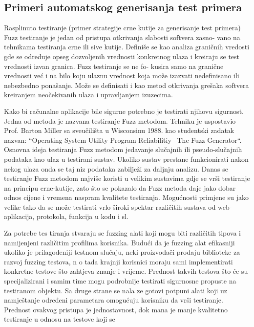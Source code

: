 \documentclass[12pt,oneside]{memoir}
\begin{document}
\subsection{Primeri automatskog generisanja test primera}
Rasplinuto testiranje (primer strategije crne kutije za generisanje test primera)
Fuzz testiranje je jedan od pristupa otkrivanja slabosti softvera zasno-
vano na tehnikama testiranja crne ili sive kutije. Definiše se kao analiza
graničnih vredosti gde se odreduje opseg dozvoljenih vrednosti konkretnog
ulaza i kreiraju se test vrednosti izvan granica. Fuzz testiranje se ne fo-
kusira samo na granične vrednosti već i na bilo koju ulaznu vrednost koja
može izazvati nedefinisano ili nebezbedno ponašanje. Može se definisati i kao metod otkrivanja grešaka softvera kreiranjem neočekivanih ulaza i
upravljanjem izuzecima. \par
Kako bi računalne aplikacije bile sigurne potrebno je testirati njihovu sigurnost. Jedna od metoda je nazvana testiranje Fuzz metodom. Tehniku je uspostavio Prof. Barton Miller sa sveučilišta u Wisconsinu 1988. kao studentski zadatak nazvan: “Operating System Utility Program 
Reliabilitiy –The Fuzz Generator“. Osnovna ideja testiranja Fuzz metodom jedavanje slučajnih ili pseudo-slučajnih podataka kao ulaz u testirani sustav. Ukoliko sustav prestane funkcionirati 
nakon nekog ulaza onda se taj niz podataka zabilježi za daljnju analizu. Danas se testiranje Fuzz 
metodom najviše koristi u velikim sustavima gdje se vrši testiranje na principu crne-kutije, zato 
što se pokazalo da Fuzz metoda daje jako dobar odnos cijene i vremena naspram kvalitete testiranja. Mogućnosti primjene su jako velike tako da se može testirati vrlo široki spektar različitih sustava od web-
aplikacija, protokola, funkcija u kodu i sl. 
\par
Za potrebe tes
tiranja stvaraju se fuzzing alati koji mogu biti različitih tipova i namijenjeni 
različitim 
profilima korisnika. Budući da je fuzzing alat efikasniji ukoliko je prilagođeniji 
testnom slučaju, neki
proizvođači prodaju biblioteke za razvoj fuzzing testova, n
o tada krajnji 
korisnici moraju sami implementirati konkretne testove što zahtjeva znanje i vrijeme. Prednost 
takvih testova što će su specijalizirani i samim time mogu podrobnije testirati sigurnosne 
propuste na testiranom objektu. Sa druge strane se nala
ze gotovi potpuni alati koji uz 
namještanje određeni parametara omogućuju korisniku da vrši testiranje. Prednost ovakvog 
pristupa je jednostavnost, dok mana je manje kvalitetno testiranje u odnosu na testove koji se 
\end{document}
